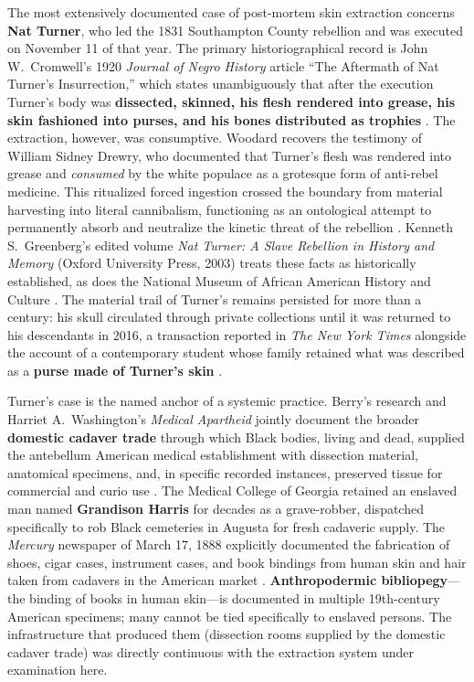 The most extensively documented case of post-mortem skin extraction concerns \textbf{Nat Turner}, who led the 1831 Southampton County rebellion and was executed on November 11 of that year. The primary historiographical record is John W.~Cromwell's 1920 \textit{Journal of Negro History} article ``The Aftermath of Nat Turner's Insurrection,'' which states unambiguously that after the execution Turner's body was \textbf{dissected, skinned, his flesh rendered into grease, his skin fashioned into purses, and his bones distributed as trophies} \cite{cromwell_turner}. The extraction, however, was consumptive. Woodard recovers the testimony of William Sidney Drewry, who documented that Turner's flesh was rendered into grease and \textit{consumed} by the white populace as a grotesque form of anti-rebel medicine. This ritualized forced ingestion crossed the boundary from material harvesting into literal cannibalism, functioning as an ontological attempt to permanently absorb and neutralize the kinetic threat of the rebellion \cite{woodard_delectable}. Kenneth S.~Greenberg's edited volume \textit{Nat Turner: A Slave Rebellion in History and Memory} (Oxford University Press, 2003) treats these facts as historically established, as does the National Museum of African American History and Culture \cite{greenberg_turner, nmaahc_turner}. The material trail of Turner's remains persisted for more than a century: his skull circulated through private collections until it was returned to his descendants in 2016, a transaction reported in \textit{The New York Times} alongside the account of a contemporary student whose family retained what was described as a \textbf{purse made of Turner's skin} \cite{nyt_turner_purse}.

Turner's case is the named anchor of a systemic practice. Berry's research and Harriet A.~Washington's \textit{Medical Apartheid} jointly document the broader \textbf{domestic cadaver trade} through which Black bodies, living and dead, supplied the antebellum American medical establishment with dissection material, anatomical specimens, and, in specific recorded instances, preserved tissue for commercial and curio use \cite{berry_ghost, washington_medical_apartheid}. The Medical College of Georgia retained an enslaved man named \textbf{Grandison Harris} for decades as a grave-robber, dispatched specifically to rob Black cemeteries in Augusta for fresh cadaveric supply. The \textit{Mercury} newspaper of March 17, 1888 explicitly documented the fabrication of shoes, cigar cases, instrument cases, and book bindings from human skin and hair taken from cadavers in the American market \cite{jim_crow_museum_leather}. \textbf{Anthropodermic bibliopegy}---the binding of books in human skin---is documented in multiple 19th-century American specimens; many cannot be tied specifically to enslaved persons. The infrastructure that produced them (dissection rooms supplied by the domestic cadaver trade) was directly continuous with the extraction system under examination here.


